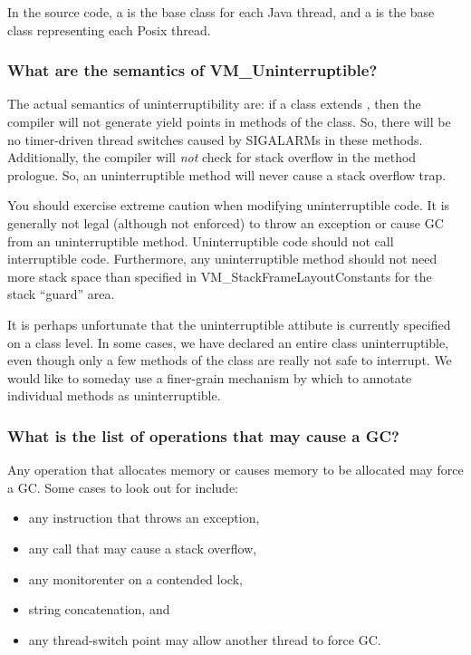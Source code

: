 In the source code, a 
is the base class for each Java
thread, and a 
is the base class representing each
Posix thread.  

\subsubsection{What are the semantics of VM\_Uninterruptible?}

The actual semantics of uninterruptibility are: if a class 
extends 
, then the compiler will not
generate yield points in methods of the class.  So, there will be no
timer-driven thread switches caused by SIGALARMs in these methods.
Additionally, the compiler will {\em not} check for stack overflow in the
method prologue.  So, an uninterruptible method will never cause a stack
overflow trap.  

You should exercise extreme caution when modifying uninterruptible code.  It
is generally not legal (although not enforced) to throw an exception or 
cause GC from an uninterruptible method.  Uninterruptible code should not
call interruptible code. Furthermore, any uninterruptible method should
not need more stack space than specified in VM\_StackFrameLayoutConstants
for the stack ``guard'' area.

It is perhaps unfortunate that the uninterruptible attibute is currently
specified on a class level.  In some cases, we have declared an entire
class uninterruptible, even though only a few methods of the class are
really not safe to interrupt.  We would like to someday use a finer-grain
mechanism by which to annotate individual methods as uninterruptible.

\subsubsection{What is the list of operations that may cause a GC?}

Any operation that allocates memory or causes memory to be allocated may
force a GC.  Some cases to look out for include:
\begin{itemize}
\item any instruction that throws an exception,
\item any call that may cause a stack overflow,
\item any monitorenter on a contended lock,
\item string concatenation, and
\item any thread-switch point may allow another thread to force GC.
\end{itemize}

